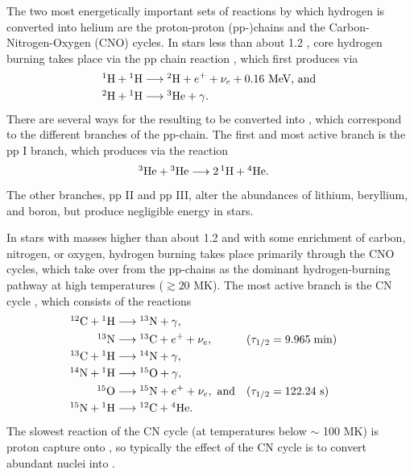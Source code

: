 The two most energetically important sets of reactions by which hydrogen is converted into helium are the proton-proton (pp-)chains and the Carbon-Nitrogen-Oxygen (CNO) cycles. In stars less than about 1.2 \Msun, core hydrogen burning takes place via the pp chain reaction \citep{Iliadis:2007ta}, which first produces  via
\begin{align*}
	\mbox{${}^{1}{\text{H}}$} + \mbox{${}^{1}{\text{H}}$} &\longrightarrow \mbox{${}^{2}{\text{H}}$} + e^+ + \nu_e + \text{0.16 MeV, and}\\
	\mbox{${}^{2}{\text{H}}$} + \mbox{${}^{1}{\text{H}}$} &\longrightarrow \mbox{${}^{3}{\text{He}}$} + \gamma.
\end{align*}
There are several ways for the resulting  to be converted into , which correspond to the different branches of the pp-chain. The first and most active branch \citep[responsible for 90\% of the energy generation in the Sun,][]{Iliadis:2007ta} is the pp I branch, which produces  via the reaction
\begin{align*}
	\mbox{${}^{3}{\text{He}}$} + \mbox{${}^{3}{\text{He}}$} &\longrightarrow 2\,\mbox{${}^{1}{\text{H}}$} + \mbox{${}^{4}{\text{He}}$}.
\end{align*}
The other branches, pp II and pp III, alter the abundances of lithium, beryllium, and boron, but produce negligible energy in stars.

In stars with masses higher than about 1.2 \Msun and with some enrichment of carbon, nitrogen, or oxygen, hydrogen burning takes place primarily through the CNO cycles, which take over from the pp-chains as the dominant hydrogen-burning pathway at high temperatures ($\gtrsim 20$ MK). The most active branch is the CN cycle \citep{Bethe:1939ed}, which consists of the reactions
\begin{align*}
	\mbox{${}^{12}{\text{C}}$} + \mbox{${}^{1}{\text{H}}$} &\longrightarrow \mbox{${}^{13}{\text{N}}$} + \gamma,\\
	\mbox{${}^{13}{\text{N}}$} &\longrightarrow \mbox{${}^{13}{\text{C}}$} + e^+ + \nu_e,	&(\tau_{1/2}&=9.965\;\text{min})\\
	\mbox{${}^{13}{\text{C}}$} + \mbox{${}^{1}{\text{H}}$} &\longrightarrow \mbox{${}^{14}{\text{N}}$} + \gamma,\\
	\mbox{${}^{14}{\text{N}}$} + \mbox{${}^{1}{\text{H}}$} &\longrightarrow \mbox{${}^{15}{\text{O}}$} + \gamma,\\
	\mbox{${}^{15}{\text{O}}$} &\longrightarrow \mbox{${}^{15}{\text{N}}$} + e^+ + \nu_e,\text{ and}	&(\tau_{1/2}&=122.24\text{ s})\\
	\mbox{${}^{15}{\text{N}}$} + \mbox{${}^{1}{\text{H}}$} &\longrightarrow \mbox{${}^{12}{\text{C}}$} + \mbox{${}^{4}{\text{He}}$}.
\end{align*}
The slowest reaction of the CN cycle (at temperatures below $\sim$ 100 MK) is proton capture onto , so typically the effect of the CN cycle is to convert abundant  nuclei into .

